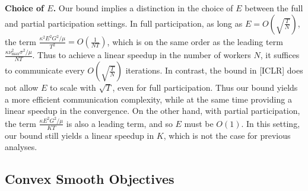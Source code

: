 %
\begin{remark}
	\textbf{Choice of $E$.} Our bound implies a distinction in the choice
	of $E$ between the full and partial participation settings. In full
	participation, as long as $E=O(\sqrt{\frac{T}{N}})$, the term $\frac{\kappa^{2}E^{2}G^{2}/\mu}{T^{2}}=O(\frac{1}{NT})$,
	which is on the same order as the leading term $\frac{\kappa\nu_{\max}^{2}\sigma^{2}/\mu}{NT}$.
	Thus to achieve a linear speedup in the number of workers $N$, it
	suffices to communicate every $O(\sqrt{\frac{T}{N}})$ iterations.
	In contrast, the bound in {[}ICLR{]} does not allow $E$ to scale
	with $\sqrt{T}$, even for full participation. Thus our bound yields
	a more efficient communication complexity, while at the same time
	providing a linear speedup in the convergence. On the other hand,
	with partial participation, the term $\frac{\kappa E^{2}G^{2}/\mu}{KT}$
	is also a leading term, and so $E$ must be $O(1)$. In this setting,
	our bound still yields a linear speedup in $K$, which is not the
	case for previous analyses. 
\end{remark}
%
\textbf{}%
\begin{comment}
This implies that $E$ canot be chosen $O(T^{\beta})$ for any $\beta>0$
without degrading the performance. This should be checked in experiments,
whether with partial participation if the communication round is set
to scale with $T$, the convergence deteriorates. This is in constrast
with the full participation case, where $E=O(\sqrt{\frac{T}{N}})$
is allowed. \textbf{If we can confirm that full participation allows
linear speedup with $\nu=N\cdot\max_{k}p_{k}\approx1$ and $E=O(\sqrt{\frac{T}{N}})$,
whereas partial participation only allows $E=O(1)$, then this would
an interesting phenomenon that is not reported by previous studies!}

The convergence result implies that with fixed $E$, as long as \$N\$
satisfies \$E=O(\textbackslash sqrt\{T/N\})\$, there is linear speedup.
When \$N\$ exceeds an upper bound, however, linear speedup may fail
to happen, and \$T/N\$ may remain constant, i.e. the number of iterations
required for convergence may increase with \$N\$. 
\end{comment}

\subsection{Convex Smooth Objectives}

